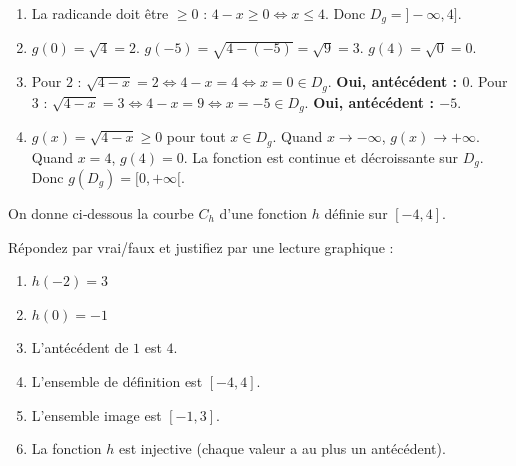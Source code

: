\documentclass[11pt]{article}
\begin{document}
\begin{corrige}[Exercice 1]
\begin{enumerate}
\item La radicande doit être $\ge 0$ : $4-x \ge 0 \iff x \le 4$. Donc $D_g = ]-\infty, 4]$.
\item $g(0) = \sqrt{4} = 2$. $g(-5) = \sqrt{4-(-5)} = \sqrt{9} = 3$. $g(4) = \sqrt{0} = 0$.
\item Pour $2$ : $\sqrt{4-x} = 2 \iff 4-x = 4 \iff x = 0 \in D_g$. \textbf{Oui, antécédent : $0$}.
Pour $3$ : $\sqrt{4-x} = 3 \iff 4-x = 9 \iff x = -5 \in D_g$. \textbf{Oui, antécédent : $-5$}.
\item $g(x) = \sqrt{4-x} \ge 0$ pour tout $x \in D_g$. Quand $x \to -\infty$, $g(x) \to +\infty$. Quand $x=4$, $g(4)=0$. La fonction est continue et décroissante sur $D_g$. Donc $g(D_g) = [0, +\infty[$.
\end{enumerate}
\end{corrige}

\begin{exercice}
On donne ci‑dessous la courbe $C_h$ d'une fonction $h$ définie sur $[-4, 4]$.
\begin{center}
\end{center}
Répondez par vrai/faux et justifiez par une lecture graphique :
\begin{enumerate}
\item $h(-2) = 3$
\item $h(0) = -1$
\item L'antécédent de $1$ est $4$.
\item L'ensemble de définition est $[-4, 4]$.
\item L'ensemble image est $[-1, 3]$.
\item La fonction $h$ est injective (chaque valeur a au plus un antécédent).
\end{enumerate}
\end{exercice}
\end{document}
